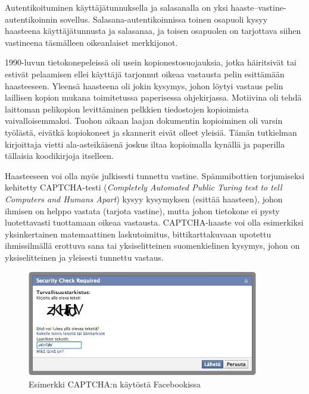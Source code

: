 \documentclass[finnish,gradu]{tktltiki}
\begin{document}
  Autentikoituminen käyttäjätunnuksella ja salasanalla on yksi haaste--vastine-autentikoinnin sovellus. Salasana-autentikoinnissa toinen osapuoli kysyy haasteena käyttäjätunnusta ja salasanaa, ja toisen osapuolen on tarjottava siihen vastineena täsmälleen oikeanlaiset merkkijonot.

  1990-luvun tietokonepeleissä oli usein kopionestosuojauksia, jotka häiritsivät tai estivät pelaamisen ellei käyttäjä tarjonnut oikeaa vastausta pelin esittämään haasteeseen. Yleensä haasteena oli jokin kysymys, johon löytyi vastaus pelin laillisen kopion mukana toimitetussa paperisessa ohjekirjassa. Motiivina oli tehdä laittoman pelikopion levittäminen pelkkien tiedostojen kopioimista vaivalloisemmaksi. Tuohon aikaan laajan dokumentin kopioiminen oli varsin työlästä, eivätkä kopiokoneet ja skannerit eivät olleet yleisiä. Tämän tutkielman kirjoittaja vietti ala-asteikäisenä joskus iltaa kopioimalla kynällä ja paperilla tällaisia koodikirjoja itselleen.

  Haasteeseen voi olla myös julkisesti tunnettu vastine. Spämmibottien torjumiseksi kehitetty CAPTCHA-testi (\emph{Completely Automated Public Turing test to tell Computers and Humans Apart}) kysyy kysymyksen (esittää haasteen), johon ihmisen on helppo vastata (tarjota vastine), mutta johon tietokone ei pysty luotettavasti tuottamaan oikeaa vastausta. CAPTCHA-haaste voi olla esimerkiksi yksinkertainen matemaattinen laskutoimitus, bittikarttakuvaan upotettu ihmissilmällä erottuva sana tai yksiselitteinen suomenkielinen kysymys, johon on yksiselitteinen ja yleisesti tunnettu vastaus.

  \begin{figure}
    \centering
    \includegraphics[width=0.9\textwidth]{images/Facebook_captcha_filled.jpg}
    \caption{Esimerkki CAPTCHA:n käytöstä Facebookissa}
    \label{fig:captcha_facebook}
  \end{figure}

\end{document}
